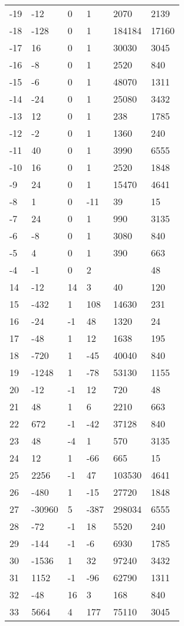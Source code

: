 \documentclass{amsart}
\begin{document}
\begin{longtable}{llllll}
-19 & -12 & 0 & 1 & 2070 & 2139\\
-18 & -128 & 0 & 1 & 184184 & 17160\\
-17 & 16 & 0 & 1 & 30030 & 3045\\
-16 & -8 & 0 & 1 & 2520 & 840\\
-15 & -6 & 0 & 1 & 48070 & 1311\\
-14 & -24 & 0 & 1 & 25080 & 3432\\
-13 & 12 & 0 & 1 & 238 & 1785\\
-12 & -2 & 0 & 1 & 1360 & 240\\
-11 & 40 & 0 & 1 & 3990 & 6555\\
-10 & 16 & 0 & 1 & 2520 & 1848\\
-9 & 24 & 0 & 1 & 15470 & 4641\\
-8 & 1 & 0 & -11 & 39 & 15\\
-7 & 24 & 0 & 1 & 990 & 3135\\
-6 & -8 & 0 & 1 & 3080 & 840\\
-5 & 4 & 0 & 1 & 390 & 663\\
-4 & -1 & 0 & 2 &  & 48\\
14 & -12 & 14 & 3 & 40 & 120\\
15 & -432 & 1 & 108 & 14630 & 231\\
16 & -24 & -1 & 48 & 1320 & 24\\
17 & -48 & 1 & 12 & 1638 & 195\\
18 & -720 & 1 & -45 & 40040 & 840\\
19 & -1248 & 1 & -78 & 53130 & 1155\\
20 & -12 & -1 & 12 & 720 & 48\\
21 & 48 & 1 & 6 & 2210 & 663\\
22 & 672 & -1 & -42 & 37128 & 840\\
23 & 48 & -4 & 1 & 570 & 3135\\
24 & 12 & 1 & -66 & 665 & 15\\
25 & 2256 & -1 & 47 & 103530 & 4641\\
26 & -480 & 1 & -15 & 27720 & 1848\\
27 & -30960 & 5 & -387 & 298034 & 6555\\
28 & -72 & -1 & 18 & 5520 & 240\\
29 & -144 & -1 & -6 & 6930 & 1785\\
30 & -1536 & 1 & 32 & 97240 & 3432\\
31 & 1152 & -1 & -96 & 62790 & 1311\\
32 & -48 & 16 & 3 & 168 & 840\\
33 & 5664 & 4 & 177 & 75110 & 3045\\

\end{longtable}
\end{document}
